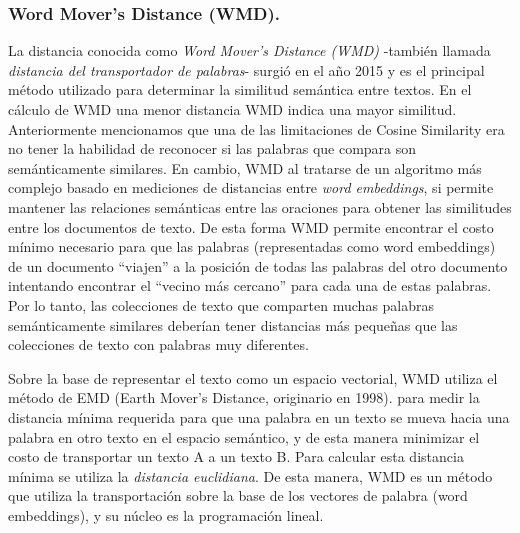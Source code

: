 \documentclass[12pt,a4paper]{article}
\begin{document}
\begin{sloppypar}
\cleardoublepage

\subsubsection{Word Mover’s Distance (WMD).}\label{wmd}

La distancia conocida como \textit{Word Mover’s Distance (WMD)} -también llamada \textit{distancia del transportador de palabras}- surgió en el año 2015\cite{wmd_paper} y es el principal método utilizado para determinar la similitud semántica entre textos\cite{similarity_survey}. En el cálculo de WMD una menor distancia WMD indica una mayor similitud.
Anteriormente mencionamos que una de las limitaciones de Cosine Similarity era no tener la habilidad de reconocer si las palabras que compara son semánticamente similares. En cambio, WMD al tratarse de un algoritmo más complejo basado en mediciones de distancias entre \textit{word embeddings}, si permite mantener las relaciones semánticas entre las oraciones para obtener las similitudes entre los documentos de texto. De esta forma WMD permite encontrar el costo mínimo necesario para que las palabras (representadas como word embeddings) de un documento “viajen” a la posición de todas las palabras del otro documento intentando encontrar el “vecino más cercano” para cada una de estas palabras. Por lo tanto, las colecciones de texto que comparten muchas palabras semánticamente similares deberían tener distancias más pequeñas que las colecciones de texto con palabras muy diferentes\cite{NLP_21}.

Sobre la base de representar el texto como un espacio vectorial, WMD utiliza el método de EMD (Earth Mover’s Distance, originario en 1998)\cite{WMD_3, WMD_4}. para medir la distancia mínima requerida para que una palabra en un texto se mueva hacia una palabra en otro texto en el espacio semántico, y de esta manera minimizar el costo de transportar un texto A a un texto B\cite{WMD_5}. Para calcular esta distancia mínima se utiliza la \textit{distancia euclidiana}. De esta manera, WMD es un método que utiliza la transportación sobre la base de los vectores de palabra (word embeddings), y su núcleo es la programación lineal\cite{wmd_paper}.


\end{sloppypar}
\end{document}
